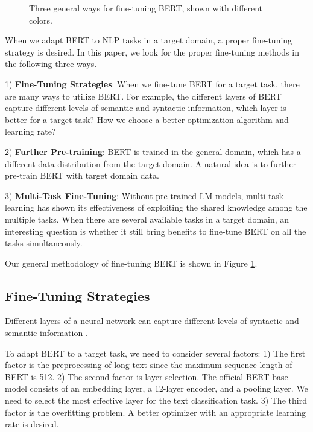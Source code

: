 \documentclass[11pt,a4paper]{article}
\theoremstyle{definition}
\begin{document}
\begin{CJK*}{UTF8}{gbsn}
\begin{figure}
	  \caption{Three general ways for fine-tuning BERT, shown with different colors.}\label{fig:arch}
\end{figure}

When we adapt BERT to NLP tasks in a target domain, a proper fine-tuning strategy is desired. In this paper, we look for the proper fine-tuning methods in the following three ways.

1) \textbf{Fine-Tuning Strategies}: When we fine-tune BERT for a target task, there are many ways to utilize BERT. For example, the different layers of BERT capture different levels of semantic and syntactic information, which layer is better for a target task? How we choose a better optimization algorithm and learning rate?

2) \textbf{Further Pre-training}: BERT is trained in the general domain, which has a different data distribution from the target domain. A natural idea is to further pre-train BERT with target domain data.

3) \textbf{Multi-Task Fine-Tuning}: Without pre-trained LM models, multi-task learning has shown its effectiveness of exploiting the shared knowledge among the multiple tasks. When there are several available tasks in a target domain, an interesting question is whether it still bring benefits to fine-tune BERT on all the tasks simultaneously.

Our general methodology of fine-tuning BERT is shown in Figure \ref{fig:arch}.

\subsection{Fine-Tuning Strategies}

Different layers of a neural network can capture different levels of syntactic and semantic information \cite{yosinski2014transferable,howard2018universal}.

To adapt BERT to a target task, we need to consider several factors: 1) The first factor is the preprocessing of long text since the maximum sequence length of BERT is 512. 2) The second factor is layer selection. The official BERT-base model consists of an embedding layer, a 12-layer encoder, and a pooling layer. We need to select the most effective layer for the text classification task. 3) The third factor is the overfitting problem. A better optimizer with an appropriate learning rate is desired.


\end{CJK*}
\end{document}
